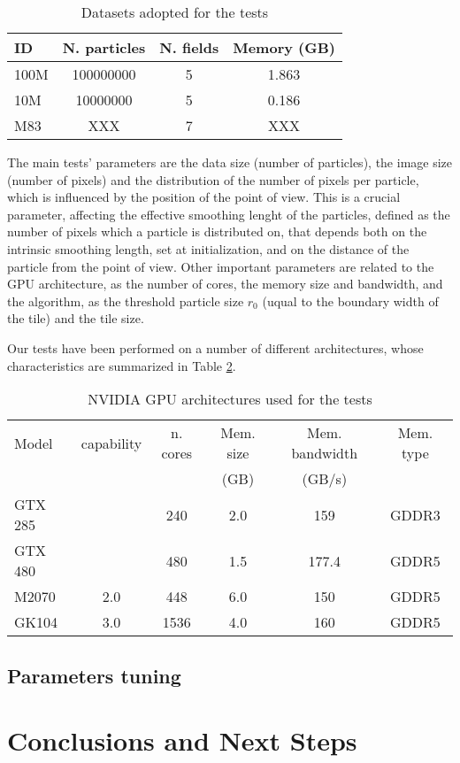 \documentclass[11pt]{article}
\begin{document}
\begin{table}
\caption{Datasets adopted for the tests}
\centering 
\begin{tabular}{l c c c} 
\hline\hline 
ID & N. particles & N. fields & Memory (GB) \\ [0.5ex] 
\hline %
100M   & 100000000 & 5 & 1.863 \\ 
10M    & 10000000  & 5 & 0.186 \\
M83    & XXX & 7 & XXX \\
\hline 
\end{tabular}
\label{table:tests}
\end{table}

The main tests' parameters are the data size (number of particles),
the image size (number of pixels) and the distribution of the number of pixels 
per particle, which is influenced by the position of the point of view.
This is a crucial parameter, affecting the effective smoothing lenght of the particles,
defined as the number of pixels which a particle is distributed on, that 
depends both on the intrinsic smoothing length, set at initialization, and 
on the distance of the particle from the point of view. Other important parameters
are related to the GPU architecture, as the number of cores, the memory size and bandwidth, and the algorithm, as the threshold particle size $r_0$ (uqual to the boundary width of the tile) and the tile size.

Our tests have been performed on a number of different architectures, 
whose characteristics are summarized in Table \ref{table:gpus}. 

\begin{table}
\caption{NVIDIA GPU architectures used for the tests}
\centering
\begin{tabular}{l c c c c c}
\hline\hline
Model   & capability & n. cores & Mem. size & Mem. bandwidth & Mem. type  \\ [0.5ex]
        &      &    & (GB)      & (GB/s)  & \\
\hline %
GTX 285 &  & 240   & 2.0 & 159   & GDDR3 \\
GTX 480 &  & 480   & 1.5 & 177.4 & GDDR5 \\
M2070   & 2.0 & 448   & 6.0 & 150   & GDDR5 \\
GK104   & 3.0 & 1536  & 4.0 & 160   & GDDR5 \\
\hline
\end{tabular}
\label{table:gpus}
\end{table}
 
\subsection{Parameters tuning}

\section{Conclusions and Next Steps}
\end{document}
